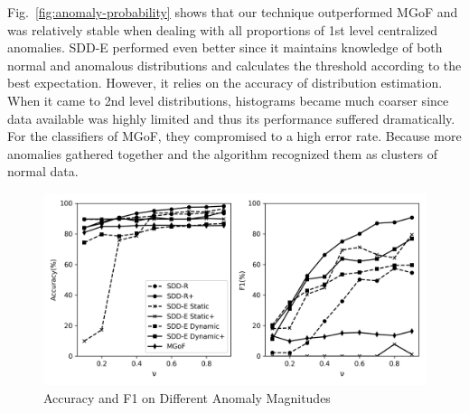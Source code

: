 \documentclass{article}
\begin{document}
			Fig.~\ref{fig:anomaly-probability} shows that our technique outperformed MGoF and was relatively stable when dealing with all proportions of 1st level centralized anomalies. SDD-E performed even better since it maintains knowledge of both normal and anomalous distributions and calculates the threshold according to the best expectation. However, it relies on the accuracy of distribution estimation. When it came to 2nd level distributions, histograms became much coarser since data available was highly limited and thus its performance suffered dramatically.
			For the classifiers of MGoF, they  compromised to a high error rate. Because more anomalies gathered together and the algorithm recognized them as clusters of normal data.
	
			\begin{figure}[!t]
				\includegraphics[width=\linewidth]{fig/PerformanceOnAnomalyMagnitude.png}
				\caption{Accuracy and F1 on Different Anomaly Magnitudes}
				\label{fig:anomaly-magnitude}
			\end{figure}
	
\end{document}
